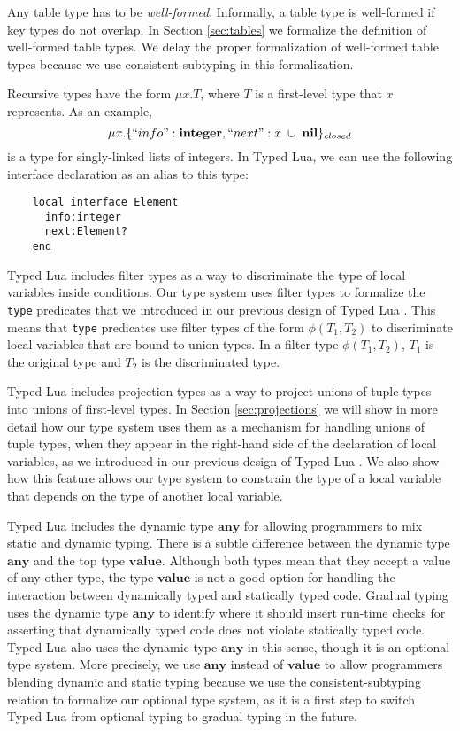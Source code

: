 \documentclass{sigplanconf}
\newcommand{\Value}{\mathbf{value}}
\newcommand{\Any}{\mathbf{any}}
\newcommand{\Nil}{\mathbf{nil}}
\newcommand{\Integer}{\mathbf{integer}}
\begin{document}
Any table type has to be \emph{well-formed}.
Informally, a table type is well-formed if key types do not overlap.
In Section \ref{sec:tables} we formalize the definition of well-formed table types.
We delay the proper formalization of well-formed table types because we use
consistent-subtyping in this formalization.

Recursive types have the form $\mu x.T$,
where $T$ is a first-level type that $x$ represents.
As an example,
\[
\mu x.\{``info":\Integer, ``next":x \;\cup\; \Nil\}_{closed}
\]
is a type for singly-linked lists of integers.
In Typed Lua, we can use the following interface declaration
as an alias to this type:
\begin{verbatim}
    local interface Element
      info:integer
      next:Element?
    end
\end{verbatim}

Typed Lua includes filter types as a way to discriminate the type of local
variables inside conditions.
Our type system uses filter types to formalize the \texttt{type} predicates
that we introduced in our previous design of Typed Lua \cite{maidl2014tl}.
This means that \texttt{type} predicates use filter types of the form
$\phi(T_{1},T_{2})$ to discriminate local variables that are bound to
union types.
In a filter type $\phi(T_{1},T_{2})$, $T_{1}$ is the original type and
$T_{2}$ is the discriminated type.

Typed Lua includes projection types as a way to project
unions of tuple types into unions of first-level types.
In Section \ref{sec:projections} we will show in more detail how our type system
uses them as a mechanism for handling unions of tuple types,
when they appear in the right-hand side of the declaration of local variables,
as we introduced in our previous design of Typed Lua \cite{maidl2014tl}.
We also show how this feature allows our type system to constrain
the type of a local variable that depends on the type of another local variable.

Typed Lua includes the dynamic type $\Any$ for allowing programmers
to mix static and dynamic typing.
There is a subtle difference between the dynamic type $\Any$ and the top type $\Value$.
Although both types mean that they accept a value of any other type,
the type $\Value$ is not a good option for handling the
interaction between dynamically typed and statically typed code.
Gradual typing uses the dynamic type $\Any$ to identify
where it should insert run-time checks for asserting that dynamically
typed code does not violate statically typed code.
Typed Lua also uses the dynamic type $\Any$ in this sense,
though it is an optional type system.
More precisely, we use $\Any$ instead of $\Value$ to allow
programmers blending dynamic and static typing because we use the
consistent-subtyping relation to formalize our optional type system,
as it is a first step to switch Typed Lua from optional typing to
gradual typing in the future.
\end{document}
